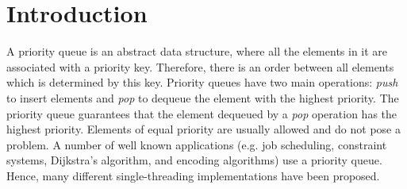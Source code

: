 \section{Introduction}\label{sec:intro}

A priority queue is an abstract data structure, where all the elements in it are associated with a priority key.
Therefore, there is an order between all elements which is determined by this key. %
Priority queues have two main operations: \textit{push} to insert elements and \textit{pop} to dequeue the element with the highest priority.
The priority queue guarantees that the element dequeued by a \textit{pop} operation has the highest priority.
Elements of equal priority are usually allowed and do not pose a problem.
A number of well known applications (e.g. job scheduling, constraint systems, Dijkstra's algorithm, and encoding algorithms) use a priority queue.
Hence, many different single-threading implementations have been proposed.

